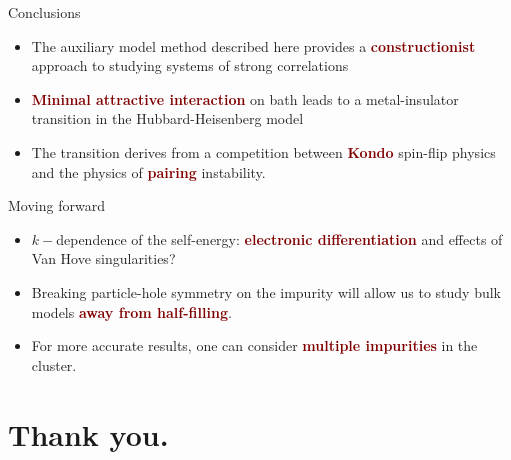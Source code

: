 \documentclass[aspectratio=169]{beamer}
\newcommand{\focus}[1]{\textcolor{maroon}{\textbf{#1}}}
\begin{document}
\begin{frame}[noframenumbering]{Conclusions}
	\begin{itemize}[<+->]
		\item The auxiliary model method described here provides a \focus{constructionist} approach to studying systems of strong correlations
		\item \focus{Minimal attractive interaction} on bath leads to a metal-insulator transition in the Hubbard-Heisenberg model
		\item The transition derives from a competition between \focus{Kondo} spin-flip physics and the physics of \focus{pairing} instability.
\end{itemize}
\end{frame}

\begin{frame}[noframenumbering]{Moving forward}
\begin{itemize}[<+->]
	\item \(k-\)dependence of the self-energy: \focus{electronic differentiation} and effects of Van Hove singularities?
	\item Breaking particle-hole symmetry on the impurity will allow us to study bulk models \focus{away from half-filling}.
	\item For more accurate results, one can consider \focus{multiple impurities} in the cluster.
\end{itemize}
\end{frame}

\section{Thank you.}
\end{document}
